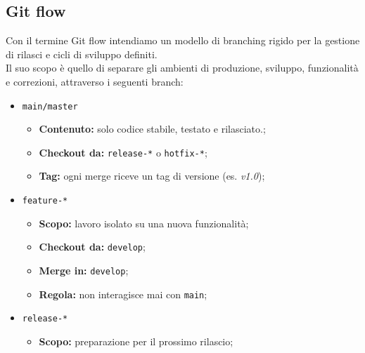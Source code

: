 \documentclass[12pt]{article}
\begin{document}
    \newpage
    \subsection{Git flow}
    Con il termine Git flow intendiamo un modello di branching rigido per la gestione di rilasci e cicli di sviluppo definiti.\\
    Il suo scopo è quello di separare gli ambienti di produzione, sviluppo, funzionalità e correzioni, attraverso i seguenti branch:
    \begin{itemize}
      \item \texttt{main/master}
        \begin{itemize}
          \item \textbf{Contenuto:} solo codice stabile, testato e rilasciato.;
          \item \textbf{Checkout da:} \texttt{release-*} o \texttt{hotfix-*};
          \item \textbf{Tag:} ogni merge riceve un tag di versione (es. \textit{v1.0});
        \end{itemize}
      \item \texttt{feature-*}
        \begin{itemize}
          \item \textbf{Scopo:} lavoro isolato su una nuova funzionalità;
          \item \textbf{Checkout da:} \texttt{develop};
          \item \textbf{Merge in:} \texttt{develop};
          \item \textbf{Regola:} non interagisce mai con \texttt{main};
        \end{itemize}
      \item \texttt{release-*}
        \begin{itemize}
          \item \textbf{Scopo:} preparazione per il prossimo rilascio;

\end{itemize}
\end{itemize}
\end{document}

